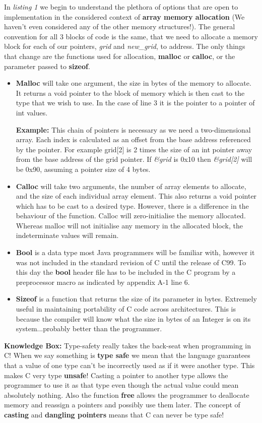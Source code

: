 \documentclass[11pt]{article} %
\begin{document}
In {\it listing 1} we begin to understand the plethora of options that are open to implementation in the considered context of {\bf array memory allocation} (We haven't even considered any of the other memory structures!). The general convention for all 3 blocks of code is the same, that we need to allocate a memory block for each of our pointers, {\it grid} and {\it new\_grid}, to address. The only things that change are the functions used for allocation, {\bf malloc} or {\bf calloc}, or the parameter passed to {\bf sizeof}.
\begin{itemize}
\item {\bf Malloc} will take one argument, the size in bytes of the memory to allocate. It returns a void pointer to the block of memory which is then cast to the type that we wish to use. In the case of line 3 it is the pointer to a pointer of int values. 
\begin{mdframed}
{\bf Example: }This chain of pointers is necessary as we need a two-dimensional array. Each index is calculated as an offset from the base address referenced by the pointer. For example grid[2] is 2 times the size of an int pointer away from the base address of the grid pointer. If {\it \&grid} is 0x10 then {\it \&grid[2]} will be 0x90, assuming a pointer size of 4 bytes.
\end{mdframed}
\item {\bf Calloc} will take two arguments, the number of array elements to allocate, and the size of each individual array element. This also returns a void pointer which has to be cast to a desired type. However, there is a difference in the behaviour of the function. Calloc will zero-initialise the memory allocated. Whereas malloc will not initialise any memory in the allocated block, the indeterminate values will remain. 
\item {\bf Bool} is a data type most Java programmers will be familiar with, however it was not included in the standard revision of C until the release of C99. To this day the {\bf bool} header file has to be included in the C program by a preprocessor macro as indicated by appendix A-1 line 6. 
\item {\bf Sizeof} is a function that returns the size of its parameter in bytes. Extremely useful in maintaining portability of C code across architectures. This is because the compiler will know what the size in bytes of an Integer is on its system...probably better than the programmer.
\end{itemize}
\begin{mdframed}
{\bf Knowledge Box:} Type-safety really takes the back-seat when programming in C! When we say something is {\bf type safe} we mean that the language guarantees that a value of one type can't be incorrectly used as if it were another type. This makes C very type {\bf unsafe}! Casting a pointer to another type allows the programmer to use it as that type even though the actual value could mean absolutely nothing. Also the function {\bf free} allows the programmer to deallocate memory and reassign a pointers and possibly use them later. The concept of {\bf casting} and {\bf dangling pointers} means that C can never be type safe! \cite[PLDI B, Lane]{ref11}
\end{mdframed}
\end{document}
